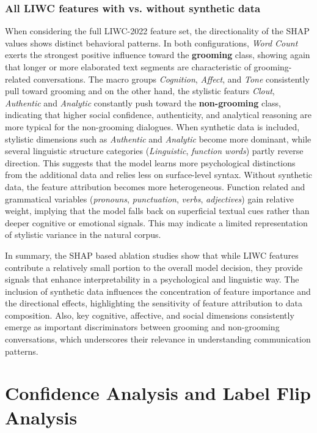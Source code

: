 \subsubsection{All LIWC features with vs. without synthetic data}
When considering the full LIWC-2022 feature set, the directionality of the SHAP values shows distinct behavioral patterns. In both configurations, \textit{Word Count} exerts the strongest positive influence toward the \textbf{grooming} class, showing again that longer or more elaborated text segments are characteristic of grooming-related conversations. The macro groups \textit{Cognition}, \textit{Affect}, and \textit{Tone} consistently pull toward grooming and on the other hand, the stylistic featurs \textit{Clout}, \textit{Authentic} and \textit{Analytic} constantly push toward the \textbf{non-grooming} class, indicating that higher social confidence, authenticity, and analytical reasoning are more typical for the non-grooming dialogues. When synthetic data is included, stylistic dimensions such as \textit{Authentic} and \textit{Analytic} become more dominant, while several linguistic structure categories (\textit{Linguistic}, \textit{function words}) partly reverse direction. This suggests that the model learns more psychological distinctions from the additional data and relies less on surface-level syntax. Without synthetic data, the feature attribution becomes more heterogeneous. Function related and grammatical variables (\textit{pronouns}, \textit{punctuation}, \textit{verbs}, \textit{adjectives}) gain relative weight, implying that the model falls back on superficial textual cues rather than deeper cognitive or emotional signals. This may indicate a limited representation of stylistic variance in the natural corpus.

In summary, the SHAP based ablation studies show that while LIWC features contribute a relatively small portion to the overall model decision, they provide signals that enhance interpretability in a psychological and linguistic way. The inclusion of synthetic data influences the concentration of feature importance and the directional effects, highlighting the sensitivity of feature attribution to data composition. Also, key cognitive, affective, and social dimensions consistently emerge as important discriminators between grooming and non-grooming conversations, which underscores their relevance in understanding communication patterns.


\section{Confidence Analysis and Label Flip Analysis} \label{sec:confidence_and_label_flip_analysis}

